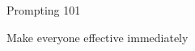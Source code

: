 \begin{frame}[fragile]\frametitle{}
\begin{center}
{\Large Prompting 101}

{\small Make everyone effective immediately}
\end{center}
\end{frame}

%

%
%
%

